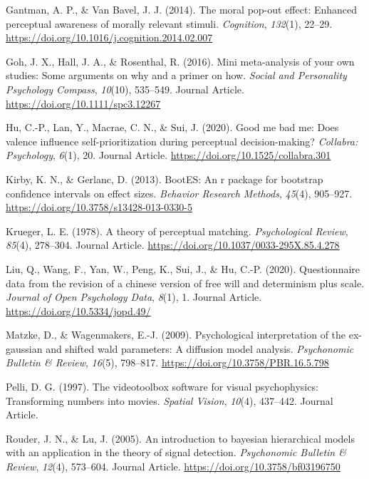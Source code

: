 \documentclass[
  english,
  man]{apa6}
\begin{document}
\leavevmode\hypertarget{ref-gantman_moral_2014}{}%
Gantman, A. P., \& Van Bavel, J. J. (2014). The moral pop-out effect: Enhanced perceptual awareness of morally relevant stimuli. \emph{Cognition}, \emph{132}(1), 22--29. \url{https://doi.org/10.1016/j.cognition.2014.02.007}

\leavevmode\hypertarget{ref-Goh_2016_mini}{}%
Goh, J. X., Hall, J. A., \& Rosenthal, R. (2016). Mini meta-analysis of your own studies: Some arguments on why and a primer on how. \emph{Social and Personality Psychology Compass}, \emph{10}(10), 535--549. Journal Article. \url{https://doi.org/10.1111/spc3.12267}

\leavevmode\hypertarget{ref-Hu_2020_GoodSelf}{}%
Hu, C.-P., Lan, Y., Macrae, C. N., \& Sui, J. (2020). Good me bad me: Does valence influence self-prioritization during perceptual decision-making? \emph{Collabra: Psychology}, \emph{6}(1), 20. Journal Article. \url{https://doi.org/10.1525/collabra.301}

\leavevmode\hypertarget{ref-kirby_bootes_2013}{}%
Kirby, K. N., \& Gerlanc, D. (2013). BootES: An r package for bootstrap confidence intervals on effect sizes. \emph{Behavior Research Methods}, \emph{45}(4), 905--927. \url{https://doi.org/10.3758/s13428-013-0330-5}

\leavevmode\hypertarget{ref-Krueger_1978}{}%
Krueger, L. E. (1978). A theory of perceptual matching. \emph{Psychological Review}, \emph{85}(4), 278--304. Journal Article. \url{https://doi.org/10.1037/0033-295X.85.4.278}

\leavevmode\hypertarget{ref-Liu_2020_JOPD}{}%
Liu, Q., Wang, F., Yan, W., Peng, K., Sui, J., \& Hu, C.-P. (2020). Questionnaire data from the revision of a chinese version of free will and determinism plus scale. \emph{Journal of Open Psychology Data}, \emph{8}(1), 1. Journal Article. \url{https://doi.org/10.5334/jopd.49/}

\leavevmode\hypertarget{ref-matzke_psychological_2009}{}%
Matzke, D., \& Wagenmakers, E.-J. (2009). Psychological interpretation of the ex-gaussian and shifted wald parameters: A diffusion model analysis. \emph{Psychonomic Bulletin \& Review}, \emph{16}(5), 798--817. \url{https://doi.org/10.3758/PBR.16.5.798}

\leavevmode\hypertarget{ref-Pelli_1997}{}%
Pelli, D. G. (1997). The videotoolbox software for visual psychophysics: Transforming numbers into movies. \emph{Spatial Vision}, \emph{10}(4), 437--442. Journal Article.

\leavevmode\hypertarget{ref-Rouder_2005_BHM_SDT}{}%
Rouder, J. N., \& Lu, J. (2005). An introduction to bayesian hierarchical models with an application in the theory of signal detection. \emph{Psychonomic Bulletin \& Review}, \emph{12}(4), 573--604. Journal Article. \url{https://doi.org/10.3758/bf03196750}
\end{document}

